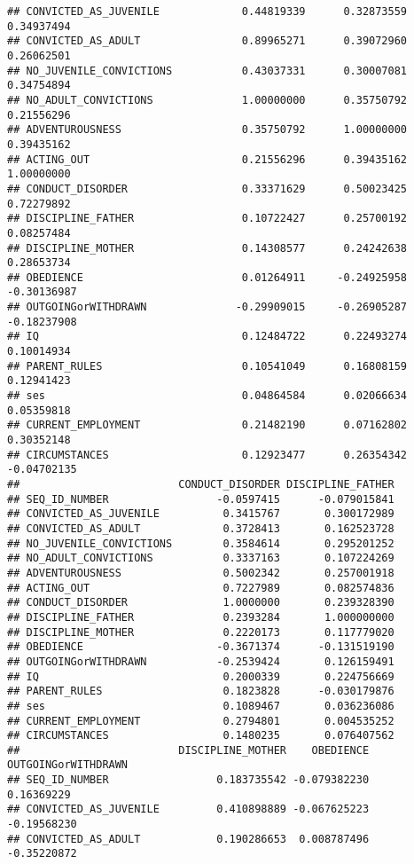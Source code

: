 \documentclass[]{article}
\begin{document}
\begin{verbatim}
## CONVICTED_AS_JUVENILE             0.44819339      0.32873559  0.34937494
## CONVICTED_AS_ADULT                0.89965271      0.39072960  0.26062501
## NO_JUVENILE_CONVICTIONS           0.43037331      0.30007081  0.34754894
## NO_ADULT_CONVICTIONS              1.00000000      0.35750792  0.21556296
## ADVENTUROUSNESS                   0.35750792      1.00000000  0.39435162
## ACTING_OUT                        0.21556296      0.39435162  1.00000000
## CONDUCT_DISORDER                  0.33371629      0.50023425  0.72279892
## DISCIPLINE_FATHER                 0.10722427      0.25700192  0.08257484
## DISCIPLINE_MOTHER                 0.14308577      0.24242638  0.28653734
## OBEDIENCE                         0.01264911     -0.24925958 -0.30136987
## OUTGOINGorWITHDRAWN              -0.29909015     -0.26905287 -0.18237908
## IQ                                0.12484722      0.22493274  0.10014934
## PARENT_RULES                      0.10541049      0.16808159  0.12941423
## ses                               0.04864584      0.02066634  0.05359818
## CURRENT_EMPLOYMENT                0.21482190      0.07162802  0.30352148
## CIRCUMSTANCES                     0.12923477      0.26354342 -0.04702135
##                         CONDUCT_DISORDER DISCIPLINE_FATHER
## SEQ_ID_NUMBER                 -0.0597415      -0.079015841
## CONVICTED_AS_JUVENILE          0.3415767       0.300172989
## CONVICTED_AS_ADULT             0.3728413       0.162523728
## NO_JUVENILE_CONVICTIONS        0.3584614       0.295201252
## NO_ADULT_CONVICTIONS           0.3337163       0.107224269
## ADVENTUROUSNESS                0.5002342       0.257001918
## ACTING_OUT                     0.7227989       0.082574836
## CONDUCT_DISORDER               1.0000000       0.239328390
## DISCIPLINE_FATHER              0.2393284       1.000000000
## DISCIPLINE_MOTHER              0.2220173       0.117779020
## OBEDIENCE                     -0.3671374      -0.131519190
## OUTGOINGorWITHDRAWN           -0.2539424       0.126159491
## IQ                             0.2000339       0.224756669
## PARENT_RULES                   0.1823828      -0.030179876
## ses                            0.1089467       0.036236086
## CURRENT_EMPLOYMENT             0.2794801       0.004535252
## CIRCUMSTANCES                  0.1480235       0.076407562
##                         DISCIPLINE_MOTHER    OBEDIENCE OUTGOINGorWITHDRAWN
## SEQ_ID_NUMBER                 0.183735542 -0.079382230          0.16369229
## CONVICTED_AS_JUVENILE         0.410898889 -0.067625223         -0.19568230
## CONVICTED_AS_ADULT            0.190286653  0.008787496         -0.35220872

\end{verbatim}
\end{document}

